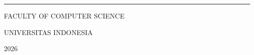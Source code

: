 \begin{center}
\vspace{16pt}

{\color{rulegrey}\rule{0.55\textwidth}{0.6pt}}

\vspace{10pt}

{\fontsize{12}{15}\selectfont\color{inkgrey}
FACULTY OF COMPUTER SCIENCE\par
UNIVERSITAS INDONESIA\par
\vspace{3pt}
2026\par}

\vspace*{0.2cm}

\end{center}

\newpage
